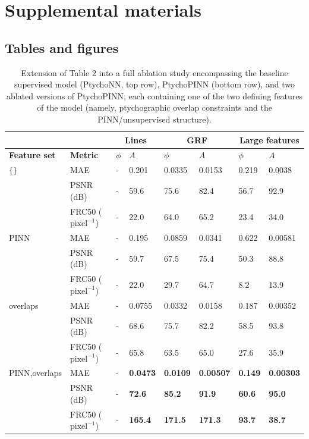 \documentclass[sn-mathphys]{sn-jnl}%
\theoremstyle{thmstyleone}%
\theoremstyle{thmstyletwo}%
\theoremstyle{thmstylethree}%
\begin{document}
\renewcommand{\tablename}{Supplementary Table}
\renewcommand{\figurename}{Supplementary Figure}

\section{Supplemental materials}
\subsection{Tables and figures}
\begin{table}[h]
\begin{center}
\caption{Extension of Table 2 into a full ablation study encompassing the baseline supervised  model (PtychoNN, top row), PtychoPINN (bottom row), and two ablated versions of PtychoPINN, each containing one of the two defining features of the model (namely, ptychographic overlap constraints and the PINN/unsupervised structure).}\label{tab_ablation}
\begin{tabular}{p{2cm}l|ll|ll|ll}
\toprule
 & \multicolumn{1}{c}{} & \multicolumn{2}{c}{Lines} & \multicolumn{2}{c}{GRF} & \multicolumn{2}{c}{Large features}\\
\midrule
\bf{Feature set} & \bf{Metric}
& $\phi$ & $A$
& $\phi$ & $A$
& $\phi$ & $A$ \\
\midrule
$\{\}$\footnotemark[1]
& MAE & - & 0.201 & 0.0335 & 0.0153 & 0.219 & 0.0038 \\
& PSNR (dB) & - & 59.6 & 75.6 & 82.4 & 56.7 & 92.9 \\
& FRC50 ($\mathrm{pixel}^{-1}$) & - & 22.0 & 64.0 & 65.2 & 23.4 & 34.0 \\
\midrule
PINN
& MAE & - & 0.195 & 0.0859 & 0.0341 & 0.622 & 0.00581 \\
& PSNR (dB) & - & 59.7 & 67.5 & 75.4 & 50.3 & 88.8 \\
& FRC50 ($\mathrm{pixel}^{-1}$) & - & 22.0 & 29.7 & 64.7 & 8.2 & 13.9 \\
\midrule
overlaps
& MAE & - & 0.0755 & 0.0332 & 0.0158 & 0.187 & 0.00352 \\
& PSNR (dB) & - & 68.6 & 75.7 & 82.2 & 58.5 & 93.8 \\
& FRC50 ($\mathrm{pixel}^{-1}$) & - & 65.8 & 63.5 & 65.0 & 27.6 & 35.9 \\
\midrule
PINN,overlaps\footnotemark[2]
& MAE & - & \textbf{0.0473} & \textbf{0.0109} & \textbf{0.00507} & \textbf{0.149} & \textbf{0.00303} \\
& PSNR (dB) & - & \textbf{72.6} & \textbf{85.2} & \textbf{91.9} & \textbf{60.6} & \textbf{95.0} \\
& FRC50 ($\mathrm{pixel}^{-1}$) & - & \textbf{165.4} & \textbf{171.5} & \textbf{171.3} & \textbf{93.7} & \textbf{38.7} \\
\midrule
\end{tabular}
\end{center}
\end{table}
\end{document}
